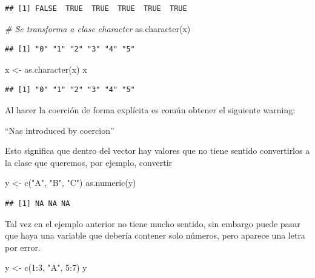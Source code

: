 \documentclass[
  12pt,
]{book}
\newenvironment{Shaded}{\begin{snugshade}}{\end{snugshade}}
\newcommand{\CommentTok}[1]{\textcolor[rgb]{0.56,0.35,0.01}{\textit{#1}}}
\newcommand{\DecValTok}[1]{\textcolor[rgb]{0.00,0.00,0.81}{#1}}
\newcommand{\FunctionTok}[1]{\textcolor[rgb]{0.00,0.00,0.00}{#1}}
\newcommand{\NormalTok}[1]{#1}
\newcommand{\OtherTok}[1]{\textcolor[rgb]{0.56,0.35,0.01}{#1}}
\newcommand{\SpecialCharTok}[1]{\textcolor[rgb]{0.00,0.00,0.00}{#1}}
\newcommand{\StringTok}[1]{\textcolor[rgb]{0.31,0.60,0.02}{#1}}
\begin{document}
\begin{verbatim}
## [1] FALSE  TRUE  TRUE  TRUE  TRUE  TRUE
\end{verbatim}

\begin{Shaded}
\begin{Highlighting}[]
\CommentTok{\# Se transforma a clase character}
\FunctionTok{as.character}\NormalTok{(x)}
\end{Highlighting}
\end{Shaded}

\begin{verbatim}
## [1] "0" "1" "2" "3" "4" "5"
\end{verbatim}

\begin{Shaded}
\begin{Highlighting}[]
\NormalTok{x }\OtherTok{\textless{}{-}} \FunctionTok{as.character}\NormalTok{(x)}
\NormalTok{x}
\end{Highlighting}
\end{Shaded}

\begin{verbatim}
## [1] "0" "1" "2" "3" "4" "5"
\end{verbatim}

Al hacer la coerción de forma explícita es común obtener el siguiente warning:

``Nas introduced by coercion''

Esto significa que dentro del vector hay valores que no tiene sentido convertirlos a la clase que queremos, por ejemplo, convertir

\begin{Shaded}
\begin{Highlighting}[]
\NormalTok{y }\OtherTok{\textless{}{-}} \FunctionTok{c}\NormalTok{(}\StringTok{"A"}\NormalTok{, }\StringTok{"B"}\NormalTok{, }\StringTok{"C"}\NormalTok{)}
\FunctionTok{as.numeric}\NormalTok{(y)}
\end{Highlighting}
\end{Shaded}

\begin{verbatim}
## [1] NA NA NA
\end{verbatim}

Tal vez en el ejemplo anterior no tiene mucho sentido, sin embargo puede pasar que haya una variable que debería contener solo números, pero aparece una letra por error.

\begin{Shaded}
\begin{Highlighting}[]
\NormalTok{y }\OtherTok{\textless{}{-}} \FunctionTok{c}\NormalTok{(}\DecValTok{1}\SpecialCharTok{:}\DecValTok{3}\NormalTok{, }\StringTok{"A"}\NormalTok{, }\DecValTok{5}\SpecialCharTok{:}\DecValTok{7}\NormalTok{)}
\NormalTok{y}
\end{Highlighting}
\end{Shaded}
\end{document}
